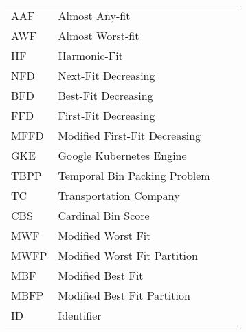 \begin{flushleft}
\begin{longtable}{l p{0.8\linewidth}}
\pagebreak
AAF      & Almost Any-fit \\
AWF      & Almost Worst-fit \\
HF       & Harmonic-Fit \\ 
NFD      & Next-Fit Decreasing \\
BFD      & Best-Fit Decreasing \\
FFD      & First-Fit Decreasing \\
MFFD     & Modified First-Fit Decreasing \\
GKE      & Google Kubernetes Engine \\
TBPP     & Temporal Bin Packing Problem \\
TC       & Transportation Company \\
CBS      & Cardinal Bin Score \\
MWF      & Modified Worst Fit \\
MWFP     & Modified Worst Fit Partition \\
MBF      & Modified Best Fit \\
MBFP     & Modified Best Fit Partition \\
ID       & Identifier \\
\end{longtable}
\end{flushleft}

